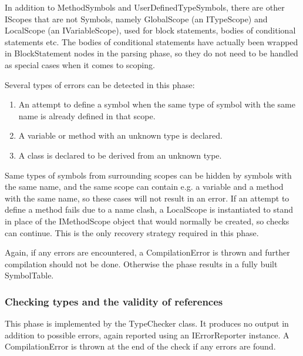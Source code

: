 \documentclass[a4paper,11pt]{article}
\begin{document}
In addition to MethodSymbols and UserDefinedTypeSymbols, there are other IScopes that are not Symbols, namely GlobalScope (an ITypeScope) and LocalScope (an IVariableScope), used for block statements, bodies of conditional statements etc. The bodies of conditional statements have actually been wrapped in BlockStatement nodes in the parsing phase, so they do not need to be handled as special cases when it comes to scoping.

Several types of errors can be detected in this phase:
\begin{enumerate}
\item An attempt to define a symbol when the same type of symbol with the same name is already defined in that scope.
\item A variable or method with an unknown type is declared.
\item A class is declared to be derived from an unknown type.
\end{enumerate}

Same types of symbols from surrounding scopes can be hidden by symbols with the same name, and the same scope can contain e.g. a variable and a method with the same name, so these cases will not result in an error. If an attempt to define a method fails due to a name clash, a LocalScope is instantiated to stand in place of the IMethodScope object that would normally be created, so checks can continue. This is the only recovery strategy required in this phase.

Again, if any errors are encountered, a CompilationError is thrown and further compilation should not be done. Otherwise the phase results in a fully built SymbolTable.

\subsubsection{Checking types and the validity of references}

This phase is implemented by the TypeChecker class. It produces no output in addition to possible errors, again reported using an IErrorReporter instance. A CompilationError is thrown at the end of the check if any errors are found.
\end{document}
